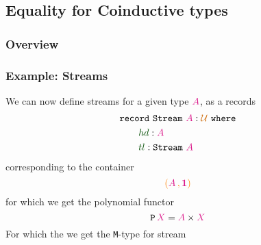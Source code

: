 \documentclass[xelatex,mathserif,serif,notheorems]{beamer} %
\theoremstyle{plain} %
\theoremstyle{definition}
\theoremstyle{remark}
\newcommand*{\term}[1]{\textcolor{green!30!black}{#1}} %
\newcommand*{\type}[1]{\textcolor{magenta!90!black}{#1}}
\newcommand*{\containerpair}[2]{\ensuremath{\colorlet{savedleftcolor}{.}\color{orange}\left(\color{savedleftcolor}#1\,\textcolor{orange}{\mathbf{,}}\,#2\color{orange}\right)\color{savedleftcolor}}}
\newcommand*{\universe}[1]{\textcolor{orange!80!black}{#1}}
\newcommand*{\unit}{\type{\textbf{1}}}
\newcommand*{\function}[1]{\textcolor{blue!60!black}{\ensuremath{\mathtt{#1}}}}
\newcommand*{\destructor}[1]{\textcolor{yellow!60!black}{\ensuremath{\mathtt{#1}}}}
\newcommand*{\typeformer}[1]{\ensuremath{\mathtt{#1}}}
\newcommand*{\functor}[1]{\ensuremath{\mathbf{\mathtt{#1}}}}
\begin{document}
\subsection{Equality for Coinductive types}
\begin{frame}
  \frametitle{Overview}
  \tableofcontents[currentsubsection]
\end{frame}

\begin{frame}[fragile]
  \frametitle{Example: Streams}
  We can now define streams for a given type \(\type{A}\), as a records
  \begin{equation}
    \begin{aligned}
      &\mathtt{record}~\typeformer{Stream}~\type{A} : \universe{\mathcal{U} }~\mathtt{where} \\
      &\qquad \term{hd} : \type{A} \\
      &\qquad \term{tl} : \typeformer{Stream}~\type{A} \\
    \end{aligned}
  \end{equation}  
  corresponding to the container
  \begin{equation}
    \containerpair{\type{A}}{\unit}
  \end{equation}
  for which we get the polynomial functor
  \begin{equation}
    \functor{P}\,\type{X} = \type{A} \times \type{X}
  \end{equation}
  For which the we get the \texttt{M}-type for stream
  \begin{figure}[h]
    \centering
  \end{figure}
\end{frame}
\end{document}
